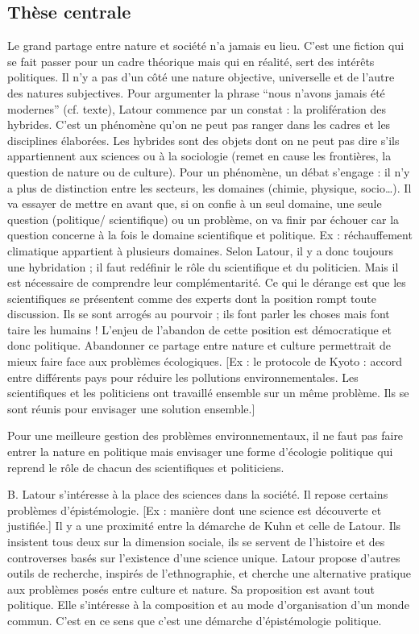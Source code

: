\subsection{Thèse centrale}
Le grand partage entre nature et société n'a jamais eu lieu.
C'est une fiction qui se fait passer pour un cadre théorique mais qui en réalité, sert des intérêts politiques.
Il n'y a pas d'un côté une nature objective, universelle et de l'autre des natures subjectives.
Pour argumenter la phrase  ``nous n'avons jamais été modernes'' (cf. texte), Latour commence par un constat : la prolifération des hybrides.
C'est un phénomène qu'on ne peut pas ranger dans les cadres et les disciplines élaborées.
Les hybrides sont des objets dont on ne peut pas dire s'ils appartiennent aux sciences ou à la sociologie (remet en cause les frontières, la question de nature ou de culture).
Pour un phénomène, un débat s'engage : il n'y a plus de distinction entre les secteurs, les domaines (chimie, physique, socio…).
Il va essayer de mettre en avant que, si on confie à un seul domaine, une seule question (politique/ scientifique) ou un problème, on va finir par échouer car la question concerne à la fois le domaine scientifique et politique.
Ex : réchauffement climatique appartient à plusieurs domaines.
Selon Latour, il y a donc toujours une hybridation ; il faut redéfinir le rôle du scientifique et du politicien.
Mais il est nécessaire de comprendre leur complémentarité.
Ce qui le dérange est que les scientifiques se présentent comme des experts dont la position rompt toute discussion.
Ils se sont arrogés au pourvoir ; ils font parler les choses mais font taire les humains ! L'enjeu de l'abandon de cette position est démocratique et donc politique.
Abandonner ce partage entre nature et culture permettrait de mieux faire face aux problèmes écologiques.
[Ex : le protocole de Kyoto : accord entre différents pays pour réduire les pollutions environnementales.
Les scientifiques et les politiciens ont travaillé ensemble sur un même problème.
Ils se sont réunis pour envisager une solution ensemble.]

Pour une meilleure gestion des problèmes environnementaux, il ne faut pas faire entrer la nature en politique mais envisager une forme d'écologie politique qui reprend le rôle de chacun des scientifiques et politiciens.

B. Latour s'intéresse à la place des sciences dans la société.
Il repose certains problèmes d'épistémologie.
[Ex : manière dont une science est découverte et justifiée.] Il y a une proximité entre la démarche de Kuhn et celle de Latour.
Ils insistent tous deux sur la dimension sociale, ils se servent de l'histoire et des controverses basés sur l'existence d'une science unique.
Latour propose d'autres outils de recherche, inspirés de l'ethnographie, et cherche une alternative pratique aux problèmes posés entre culture et nature.
Sa proposition est avant tout politique.
Elle s'intéresse à la composition et au mode d'organisation d'un monde commun.
C'est en ce sens que c'est une démarche d'épistémologie politique.

